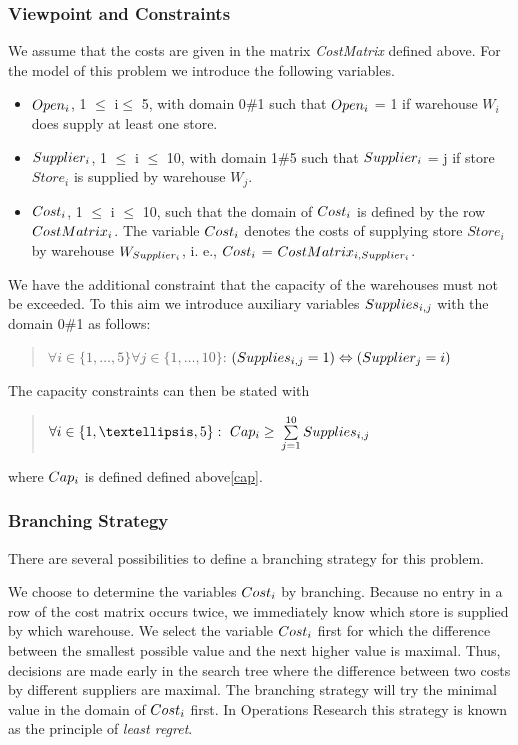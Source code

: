 \documentclass[a4paper,halfparskip]{scrartcl}
\newcommand{\Store}{\ensuremath{\mathit{Store}}}
\begin{document}
\subsubsection{Viewpoint and Constraints}
We assume that the costs are given in the matrix \emph{CostMatrix} 
defined above. For the model of this problem we introduce the 
following variables.
\begin{itemize}
\item
$\emph{Open}_i$, 1 $\leq$ i$ \leq$ 5, with domain 0$\#$1 such that 
$\emph{Open}_i$ = 1 if warehouse $W_i$ does supply at least one store.
\item
$\emph{Supplier}_i$, 1 $\leq$ i $\leq$ 10, with domain 1$\#$5 such that 
$\emph{Supplier}_i$ = j if store $\Store_i$ is supplied by 
warehouse $W_j$.
\item
$\emph{Cost}_i$, 1 $\leq$ i $\leq$ 10, such that the domain of $\emph{Cost}_i$ 
is defined by the row $\emph{CostMatrix}_i$. The variable $\emph{Cost}_i$ 
denotes the costs of supplying store $\Store_i$ by warehouse 
$W_{\emph{Supplier}_i}$, i. e., $\emph{Cost}_i$ = $\emph{CostMatrix}_{i,\emph{Supplier}_i}$.
\end{itemize}
We have the additional constraint that the capacity of the warehouses 
must not be exceeded. To this aim we introduce auxiliary variables 
$\emph{Supplies}_{i,j}$ with the domain 0$\#$1 as follows:
\begin{quote}
$\forall i \in \{1,\ldots,5\} \forall j \in \{1,\ldots, 10\}$:
$(\emph{Supplies}_{i,j} = 1) \Leftrightarrow (\emph{Supplier}_j = i)$
\end{quote}

The capacity constraints can then be stated with
\begin{quote}
$\forall i \in \{1, \ldots, 5\}:\ \emph{Cap}_i \geq $
$\sum\limits_{j=1}^{10}\emph{Supplies}_{i,j}$
\end{quote}
where $\emph{Cap}_i$ is defined defined above\ref{cap}.


\subsubsection{Branching Strategy}
There are several possibilities to define a branching 
strategy for this problem.

We choose to determine the variables $\emph{Cost}_i$ by branching. 
Because no entry in a row of the cost matrix occurs twice, we 
immediately know which store is supplied by which warehouse. 
We select the variable $\emph{Cost}_i$ first for which the difference 
between the smallest possible value and the next higher value 
is maximal. Thus, decisions are made early in the search tree 
where the difference between two costs by different suppliers 
are maximal. The branching strategy will try the minimal 
value in the domain of $\emph{Cost}_i$ first. In Operations 
Research this strategy is known as the principle of \emph{least regret}.
\end{document}
